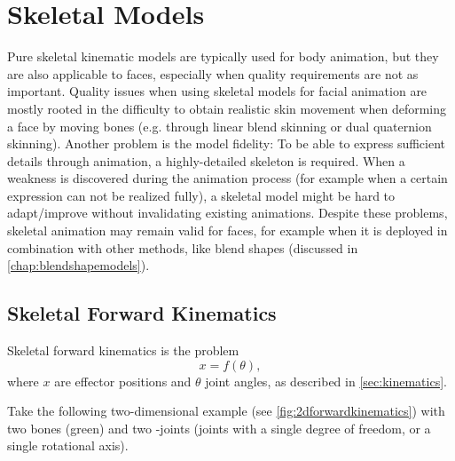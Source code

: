 \chapter{Skeletal Models}
\label{chap:skeletalmodels}

Pure skeletal kinematic models are typically used for body animation,
but they are also applicable to faces,
especially when quality requirements are not as important.
Quality issues when using skeletal models for facial animation are mostly rooted in the difficulty to obtain realistic skin movement when deforming a face by moving bones (e.g. through linear blend skinning or dual quaternion skinning).
Another problem is the model fidelity:
To be able to express sufficient details through animation,
a highly-detailed skeleton is required.
When a weakness is discovered during the animation process (for example when a certain expression can not be realized fully),
a skeletal model might be hard to adapt/improve without invalidating existing animations.
Despite these problems, skeletal animation may remain valid for faces,
for example when it is deployed in combination with other methods,
like blend shapes (discussed in \autoref{chap:blendshapemodels}).

\section{Skeletal Forward Kinematics}
\label{sec:skeletalforwardkinematics}

Skeletal forward kinematics is the problem
\[x=f(\theta),\]
where \(x\) are effector positions and \(\theta\) joint angles,
as described in \autoref{sec:kinematics}.

Take the following two-dimensional example (see \autoref{fig:2dforwardkinematics}) with two bones (green) and two -joints (joints with a single degree of freedom, or a single rotational axis).

